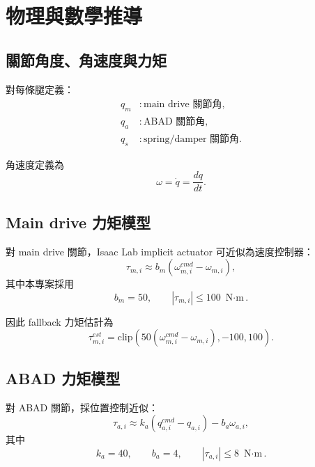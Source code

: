 \documentclass[12pt,a4paper,UTF8]{ctexart}
\begin{document}
\section{物理與數學推導}

\subsection{關節角度、角速度與力矩}

對每條腿定義：
\begin{align}
q_m &: \text{main drive 關節角}, \\
q_a &: \text{ABAD 關節角}, \\
q_s &: \text{spring/damper 關節角}.
\end{align}

角速度定義為
\begin{equation}
\omega = \dot{q} = \frac{dq}{dt}.
\end{equation}

\subsection{Main drive 力矩模型}

對 main drive 關節，Isaac Lab implicit actuator 可近似為速度控制器：
\begin{equation}
\tau_{m,i} \approx b_m \left( \omega^{cmd}_{m,i} - \omega_{m,i} \right),
\end{equation}
其中本專案採用
\begin{equation}
b_m = 50, \qquad |\tau_{m,i}| \le 100 \text{ N$\cdot$m}.
\end{equation}

因此 fallback 力矩估計為
\begin{equation}
\tau^{est}_{m,i} =
\mathrm{clip}\left(
50(\omega^{cmd}_{m,i} - \omega_{m,i}), -100, 100
\right).
\end{equation}

\subsection{ABAD 力矩模型}

對 ABAD 關節，採位置控制近似：
\begin{equation}
\tau_{a,i} \approx k_a(q^{cmd}_{a,i} - q_{a,i}) - b_a \omega_{a,i},
\end{equation}
其中
\begin{equation}
k_a = 40, \qquad b_a = 4, \qquad |\tau_{a,i}| \le 8 \text{ N$\cdot$m}.
\end{equation}
\end{document}
